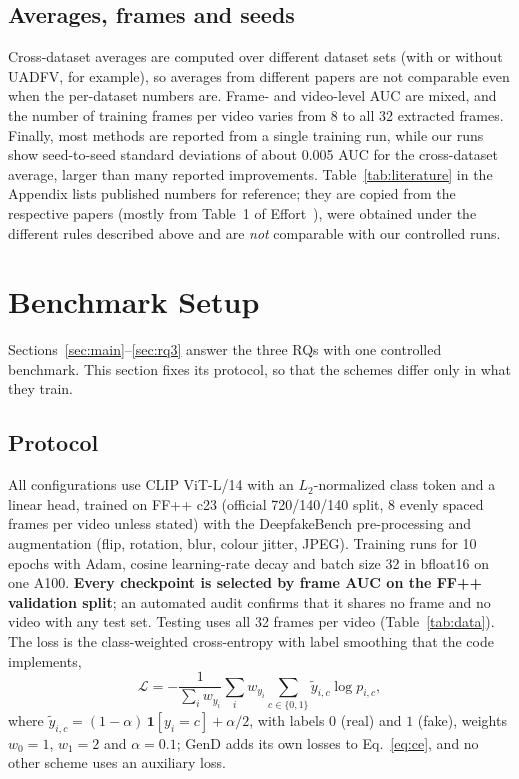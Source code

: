 \documentclass[fonts]{icst}
\begin{document}
\subsection{Averages, frames and seeds}
Cross-dataset averages are computed over different dataset sets (with or without UADFV, for example), so averages from different papers are not comparable even when the per-dataset numbers are. Frame- and video-level AUC are mixed, and the number of training frames per video varies from 8 to all 32 extracted frames. Finally, most methods are reported from a single training run, while our runs show seed-to-seed standard deviations of about 0.005 AUC for the cross-dataset average, larger than many reported improvements. Table~\ref{tab:literature} in the Appendix lists published numbers for reference; they are copied from the respective papers (mostly from Table~1 of Effort~\cite{yan2025effort}), were obtained under the different rules described above and are \emph{not} comparable with our controlled runs.



\section{Benchmark Setup}
\label{sec:bench}
Sections~\ref{sec:main}--\ref{sec:rq3} answer the three RQs with one controlled benchmark. This section fixes its protocol, so that the schemes differ only in what they train.

\subsection{Protocol}
\label{sec:protocol}
All configurations use CLIP ViT-L/14 with an $L_2$-normalized class token and a linear head, trained on FF++ c23 (official 720/140/140 split, 8 evenly spaced frames per video unless stated) with the DeepfakeBench pre-processing and augmentation (flip, rotation, blur, colour jitter, JPEG). Training runs for 10 epochs with Adam, cosine learning-rate decay and batch size 32 in bfloat16 on one A100. \textbf{Every checkpoint is selected by frame AUC on the FF++ validation split}; an automated audit confirms that it shares no frame and no video with any test set. Testing uses all 32 frames per video (Table~\ref{tab:data}). The loss is the class-weighted cross-entropy with label smoothing that the code implements,
\begin{equation}
\mathcal{L}=-\frac{1}{\sum_i w_{y_i}}\sum_{i} w_{y_i}\sum_{c\in\{0,1\}}\tilde{y}_{i,c}\log p_{i,c},
\label{eq:ce}
\end{equation}
where $\tilde{y}_{i,c}=(1-\alpha)\,\mathbf{1}[y_i=c]+\alpha/2$, with labels $0$ (real) and $1$ (fake), weights $w_0=1$, $w_1=2$ and $\alpha=0.1$; GenD adds its own losses to Eq.~\eqref{eq:ce}, and no other scheme uses an auxiliary loss.
\end{document}
